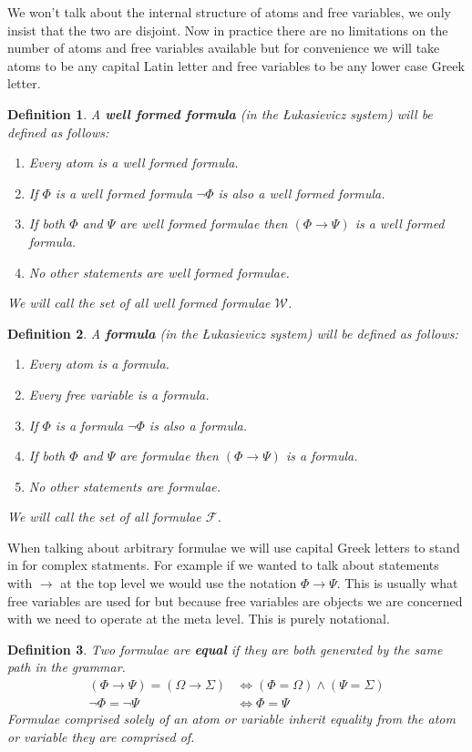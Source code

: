 \documentclass{article}
\newtheorem{defin}{Definition}
\begin{document}
We won't talk about the internal structure of atoms and free variables, we only insist that the two are disjoint.
Now in practice there are no limitations on the number of atoms and free variables available but for convenience we will take atoms to be any capital Latin letter and free variables to be any lower case Greek letter.

\begin{defin}
A \textbf{well formed formula} (in the \L ukasievicz system) will be defined as follows:
\begin{enumerate}
\item Every atom is a well formed formula.
\item If $\Phi$ is a well formed formula $\neg\Phi$ is also a well formed formula.
\item If both $\Phi$ and $\Psi$ are well formed formulae then $(\Phi\rightarrow\Psi)$ is a well formed formula.
\item No other statements are well formed formulae.
\end{enumerate}
We will call the set of all well formed formulae $\mathcal{W}$.
\end{defin}


\begin{defin}
A \textbf{formula} (in the \L ukasievicz system) will be defined as follows:
\begin{enumerate}
\item Every atom is a formula.
\item Every free variable is a formula.
\item If $\Phi$ is a formula $\neg\Phi$ is also a formula.
\item If both $\Phi$ and $\Psi$ are formulae then $(\Phi\rightarrow\Psi)$ is a formula.
\item No other statements are formulae.
\end{enumerate}
We will call the set of all formulae $\mathcal{F}$.
\end{defin}

When talking about arbitrary formulae we will use capital Greek letters to stand in for complex statments.
For example if we wanted to talk about statements with $\rightarrow$ at the top level we would use the notation $\Phi \rightarrow \Psi$.
This is usually what free variables are used for but because free variables are objects we are concerned with we need to operate at the meta level.
This is purely notational.

\begin{defin}
Two formulae are \textbf{equal} if they are both generated by the same path in the grammar.
\begin{align*}
(\Phi \rightarrow \Psi) = (\Omega \rightarrow \Sigma) &\iff (\Phi = \Omega) \land (\Psi = \Sigma) \\
\neg \Phi = \neg \Psi &\iff \Phi = \Psi
\end{align*}
Formulae comprised solely of an atom or variable inherit equality from the atom or variable they are comprised of.
\end{defin}
\end{document}
